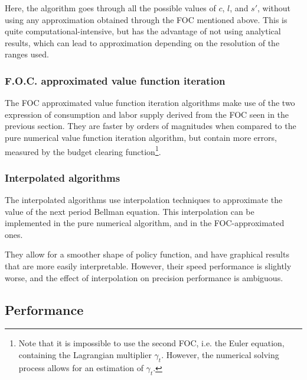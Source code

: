 \documentclass{article}
\begin{document}
Here, the algorithm goes through all the possible values of
$c$, $l$, and $s'$, without using any approximation obtained 
through the FOC mentioned above. 
This is quite computational-intensive, but 
has the advantage of not using analytical results, 
which can lead to approximation depending on the resolution of the 
ranges used.

\subsubsection{F.O.C. approximated value function iteration}

The FOC approximated value function iteration algorithms
make use of the two expression of consumption and labor supply 
derived from the FOC
seen in the previous section. 
They are faster by orders of magnitudes when compared to the pure numerical 
value function iteration algorithm,
but contain more errors, measured by the budget clearing function\footnote{Note that it is impossible to use the second FOC, i.e. the 
Euler equation, containing the 
Lagrangian multiplier $\gamma_{t}$. 
However, the numerical solving process 
allows for an estimation of $\gamma_{t}$.}.

\subsubsection{Interpolated algorithms}

The interpolated algorithms 
use interpolation techniques to approximate 
the value of the next period Bellman equation. 
This interpolation can be implemented in the pure numerical 
algorithm, and in the FOC-approximated ones. 

They allow for a smoother shape of policy function, 
and have graphical results that are more easily interpretable.
However, their speed
performance is slightly worse, 
and the effect of interpolation on precision
performance is ambiguous. 

\subsection{Performance}
\end{document}

